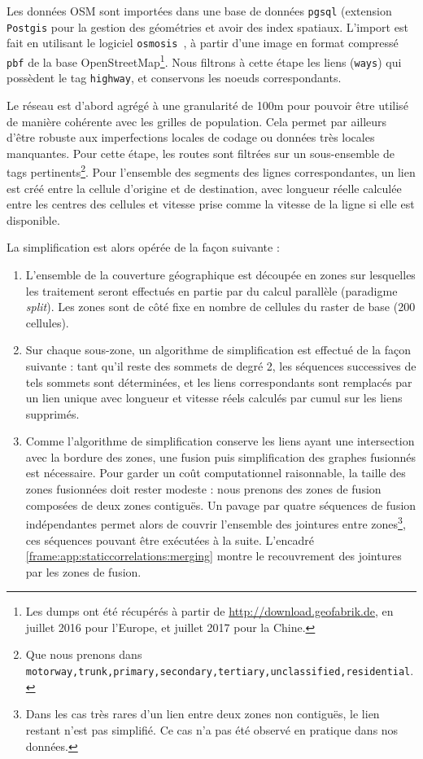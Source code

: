 Les données OSM sont importées dans une base de données \texttt{pgsql} (extension \texttt{Postgis} pour la gestion des géométries et avoir des index spatiaux. L'import est fait en utilisant le logiciel \texttt{osmosis}~\cite{osmosis}, à partir d'une image en format compressé \texttt{pbf} de la base OpenStreetMap\footnote{Les dumps ont été récupérés à partir de \url{http://download.geofabrik.de}, en juillet 2016 pour l'Europe, et juillet 2017 pour la Chine.}. Nous filtrons à cette étape les liens (\texttt{ways}) qui possèdent le tag \texttt{highway}, et conservons les noeuds correspondants.


Le réseau est d'abord agrégé à une granularité de 100m pour pouvoir être utilisé de manière cohérente avec les grilles de population. Cela permet par ailleurs d'être robuste aux imperfections locales de codage ou données très locales manquantes. Pour cette étape, les routes sont filtrées sur un sous-ensemble de tags pertinents\footnote{Que nous prenons dans \texttt{motorway,trunk,primary,secondary,tertiary,unclassified,residential}.}. Pour l'ensemble des segments des lignes correspondantes, un lien est créé entre la cellule d'origine et de destination, avec longueur réelle calculée entre les centres des cellules et vitesse prise comme la vitesse de la ligne si elle est disponible.
  
La simplification est alors opérée de la façon suivante :
\begin{enumerate}
\item L'ensemble de la couverture géographique est découpée en zones sur lesquelles les traitement seront effectués en partie par du calcul parallèle (paradigme \emph{split}). Les zones sont de côté fixe en nombre de cellules du raster de base (200 cellules).
\item Sur chaque sous-zone, un algorithme de simplification est effectué de la façon suivante : tant qu'il reste des sommets de degré 2, les séquences successives de tels sommets sont déterminées, et les liens correspondants sont remplacés par un lien unique avec longueur et vitesse réels calculés par cumul sur les liens supprimés.
\item Comme l'algorithme de simplification conserve les liens ayant une intersection avec la bordure des zones, une fusion puis simplification des graphes fusionnés est nécessaire. Pour garder un coût computationnel raisonnable, la taille des zones fusionnées doit rester modeste : nous prenons des zones de fusion composées de deux zones contiguës. Un pavage par quatre séquences de fusion indépendantes permet alors de couvrir l'ensemble des jointures entre zones\footnote{Dans les cas très rares d'un lien entre deux zones non contiguës, le lien restant n'est pas simplifié. Ce cas n'a pas été observé en pratique dans nos données.}, ces séquences pouvant être exécutées à la suite. L'encadré \ref{frame:app:staticcorrelations:merging} montre le recouvrement des jointures par les zones de fusion.
\end{enumerate}


